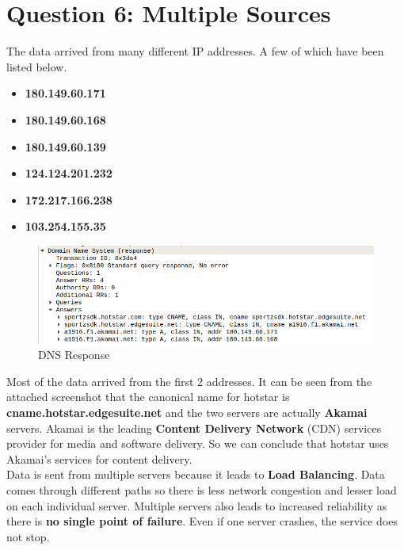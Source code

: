 \documentclass[a4paper,10pt]{article}
\newlength{\strutheight}
\begin{document}
\section*{Question 6: Multiple Sources}
The data arrived from many different IP addresses. A few of which have been listed below.
\begin{itemize}[{\color{Magenta}$\star$}]
	\item \textbf{180.149.60.171}
	\item \textbf{180.149.60.168}
	\item \textbf{180.149.60.139}
	\item \textbf{124.124.201.232}
	\item \textbf{172.217.166.238}
	\item \textbf{103.254.155.35}
\end{itemize}
\begin{adjustbox}{valign=T,raise=\strutheight,minipage={\linewidth}}
	\begin{figure}
		\includegraphics[width=12cm]{Images/DNS_response}
		\caption{DNS Response}
	\end{figure}
	\strut{}
	
	Most of the data arrived from the first 2 addresses. It can be seen from the attached screenshot that the canonical name for hotstar is \textbf{cname.hotstar.edgesuite.net} and the two servers are actually \textbf{Akamai} servers. Akamai is the leading \textbf{Content Delivery Network} (CDN) services provider for media and software delivery. So we can conclude that hotstar uses Akamai's services for content delivery. \\
	Data is sent from multiple servers because it leads to \textbf{Load Balancing}. Data comes through different paths so there is less network congestion and lesser load on each individual server. Multiple servers also leads to increased reliability as there is \textbf{no single point of failure}. Even if one server crashes, the service does not stop.
\end{adjustbox} 
\end{document}
